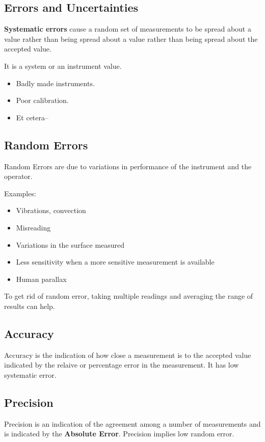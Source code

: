 \documentclass[11pt]{article}
\begin{document}
\subsection{Errors and Uncertainties}
    {\bf Systematic errors} cause a random set of measurements to be spread about a
    value rather than being spread about a value rather than being spread about the
    accepted value.

    It is a system or an instrument value.
    \begin{itemize}
      \item Badly made instruments.
      \item Poor calibration.
      \item Et cetera--
    \end{itemize}
\subsection{Random Errors}
    Random Errors are due to variations in performance of the instrument and the
    operator.

    Examples:
    \begin{itemize}
      \item Vibrations, convection
      \item Misreading
      \item Variations in the surface measured
      \item Less sensitivity when a more sensitive measurement is available
      \item Human parallax
    \end{itemize}
    To get rid of random error, taking multiple readings and averaging the range of
    results can help.

\subsection{Accuracy}
    Accuracy is the indication of how close a measurement is to the accepted value
    indicated by the relaive or percentage error in the measurement.  It has low
    systematic error.

\subsection{Precision}
    Precision is an indication of the agreement among a number of measurements and
    is indicated by the {\bf Absolute Error}.  Precision implies low random error.
\end{document}
